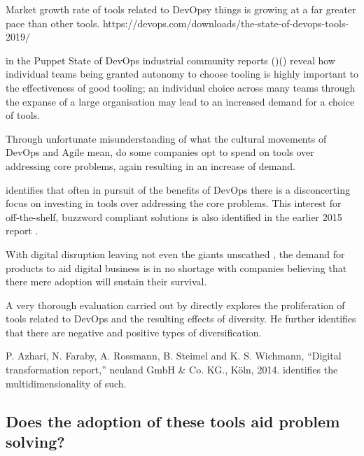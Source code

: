 Market growth rate of tools related to DevOpsy things is growing at a far greater pace than other tools. https://devops.com/downloads/the-state-of-devops-tools-2019/

\citeauthor{sodrPuppet2017} in the Puppet State of DevOps industrial community reports ()() reveal how individual teams being granted autonomy to choose tooling is highly important to the effectiveness of good tooling; an individual choice across many teams through the expanse of a large organisation may lead to an increased demand for a choice of tools.

Through unfortunate misunderstanding of what the cultural movements of DevOps and Agile mean, do some companies opt to spend on tools over addressing core problems, again resulting in an increase of demand.

\cite{sodrAccelerate2018} identifies that often in pursuit of the benefits of DevOps there is a disconcerting focus on investing in tools over addressing the core problems. This interest for off-the-shelf, buzzword compliant solutions is also identified in the earlier 2015 report \parencite{sodrPuppet2015}.

With digital disruption leaving not even the giants unscathed \parencite{weForum2016}, the demand for products to aid digital business is in no shortage with companies believing that there mere adoption will sustain their survival.

A very thorough evaluation carried out by \cite{kersten2018cambrian} directly explores the proliferation of tools related to DevOps and the resulting effects of diversity. He further identifies that there are negative and positive types of diversification.

P. Azhari, N. Faraby, A. Rossmann, B. Steimel and K. S. Wichmann, “Digital transformation report,” neuland GmbH \& Co. KG., Köln, 2014.  identifies the multidimensionality of such.

\subsection{Does the adoption of these tools aid problem solving?}




